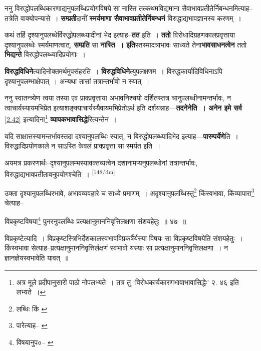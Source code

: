 \documentclass[article,12pt,a4paper]{memoir}
\begin{document}
	  \pstart ननु विरुद्धोपलब्धिकारणाद्यनुपलब्धिप्रयोगविषये सा नास्ति तत्कथमविद्यमाना सैवाभावप्रतीतेर्निबन्धनमित्याह--तत्रेति वाक्योपन्यासे । \textbf{सम्प्रती}दानीं \textbf{स्मर्यमाणा सैवाभावप्रतीतेर्निबन्धनं} विरुद्धाद्यभावज्ञानस्य करणम् ।
	\pend
      

	  \pstart कथं तर्हि दृश्यानुपलब्धेर्विरुद्धोपलब्ध्यादीनां भेद इत्याह--\textbf{तत} इति । \textbf{ततो} विरोधादिग्रहणकालप्रवृत्ताया दृश्यानुपलब्धेः स्मर्यमाणत्वात्, \textbf{सम्प्रति} सा \textbf{नास्ति । इति}स्तस्मादत्राभावः साध्यते तेना\textbf{भावसाधनत्वेन} ततो \textbf{भिद्यन्ते} विरुद्धोपलब्ध्यादिप्रयोगाः ।
	\pend
      

	  \pstart \textbf{विरुद्धविधिने}त्यादिनोक्तमर्थमुपसंहरति । \textbf{विरुद्धविधिने}त्युपलक्षणम । विरुद्धकार्यादिविधिनाऽपि दृश्यानुपलम्भाक्षेपात् । अन्यथा तासां तत्रान्तर्भावो न स्यात् ।
	\pend
      

	  \pstart ननु स्वातन्त्र्येण त्वया तस्या एव प्राक्प्रवृत्ताया अभावनिश्चयो दर्शितस्तत्र चानुपलब्धीनामन्तर्भावः, न त्वाचार्यस्यायमभिप्रेत इत्याशङ्क्याचार्यस्यैवायमभिप्रेतोऽर्थ इति दर्शयन्नाह—\textbf{तदनेनेति । अनेन इमे सर्व} \cref{2.42} इत्यादिना\footnote{अत्र मूले प्रदीपानुसारी पाठो नोपलभ्यते । तत्र तु ‘विरोधकार्यकारणभावाभावासिद्धेः’ २. ४६ इति लभ्यते ।} \textbf{व्यापकभावासिद्धे}रित्यन्तेन ।
	\pend
      

	  \pstart यदि साक्षात्तस्यामन्तर्भावस्तदा दश्यानुपलब्धिः स्यात्, न बिरुद्धोपलब्ध्यादिभेद इत्याह—\textbf{पारम्पर्येणे}ति । विरुद्धादिप्रयोगकाले न साऽस्ति केवलं प्राक्प्रवृत्ता सा स्मर्यत इति ।
	\pend
      

	  \pstart अयमत्र प्रकरणार्थः--दृश्यानुपलम्भस्यावक्तव्यत्वेन दशानामप्यनुपलब्धोनां तत्रान्तर्भावः, विरुद्धाद्यभावप्रतीतावनुपयोगश्चेति ।
	\pend
      \leavevmode\textsuperscript{\rmlatinfont\tiny [148/dm]}

	  \pstart उक्ता दृश्यानुपलब्धिरभावे, अभावव्यवहारे च साध्ये प्रमाणम् । अदृश्यानुपलब्धिस्तु\footnote{लब्धिः किं \cite{dp-msA} \cite{dp-edP} \cite{dp-edH} \cite{dp-edE}} किंस्वभावा, किंव्यापारा\footnote{पारेत्याह--\cite{dp-msB} \cite{dp-msD}} चेत्याह--
	\pend
       

	  \pstart विप्रकृष्टविषया\footnote{विषयानुप०--\cite{dp-msB} \cite{dp-msC} \cite{dp-edH} \cite{dp-edE} \cite{dp-edN}} पुनरनुपलब्धिः प्रत्यक्षानुमाननिवृत्तिलक्षणा संशयहेतुः ॥ ४७ ॥
	\pend
       

	  \pstart विप्रकृष्टेत्यादि । विप्रकृष्टस्त्रिभिर्देशकालस्वभावविप्रकर्षैर्यस्या विषयः सा विप्रकृष्टविषयेति संशयहेतुः । किंस्वभावा सेत्याह--प्रत्यक्षानुमाननिवृत्तिर्लक्षणं स्वभावो यस्याः सा प्रत्यक्षानुमाननिवृत्तिलक्षणा । न ज्ञानज्ञेयस्वभावेति यावत् ॥
	\pend
      
\end{document}
